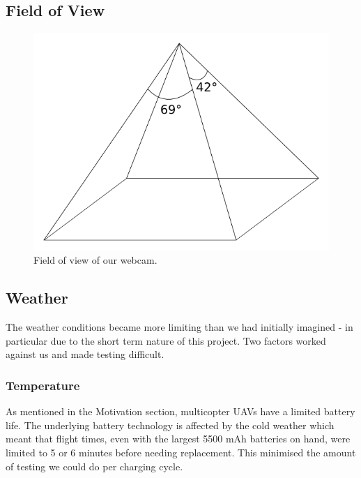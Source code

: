 \documentclass[10pt]{scrartcl} %
\begin{document}
\subsection{Field of View}




\begin{figure}[h]
    \centering
    \includegraphics{images/fov.png}
    \caption{Field of view of our webcam.}
    \label{fig:fov}
\end{figure}

\subsection{Weather}
The weather conditions became more limiting than we had initially imagined - in particular due to the short term nature of this project. Two factors worked against us and made testing difficult.

\subsubsection{Temperature}
As mentioned in the Motivation section, multicopter UAVs have a limited battery life. The underlying battery technology is affected by the cold weather which meant that flight times, even with the largest 5500 mAh batteries on hand, were limited to 5 or 6 minutes before needing replacement. This minimised the amount of testing we could do per charging cycle.
\end{document}
